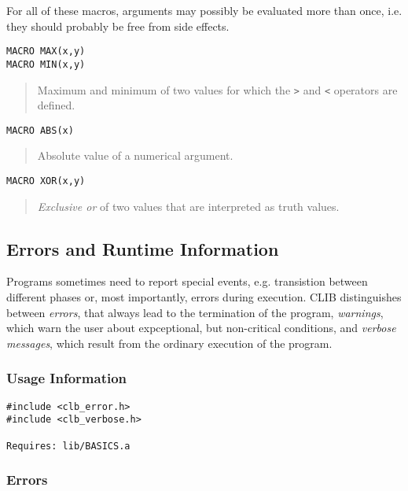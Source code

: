 For all of these macros, arguments may possibly be evaluated more than
once, i.e. they should probably be free from side effects.

\begin{verbatim}
MACRO MAX(x,y)
MACRO MIN(x,y)
\end{verbatim}
\begin{quote}
  Maximum and minimum of two values for which the \texttt{>} and
  \texttt{<} operators are defined.
\end{quote}

\begin{verbatim}
MACRO ABS(x)
\end{verbatim}
\begin{quote}
  Absolute value of a numerical argument.
\end{quote}

\begin{verbatim}
MACRO XOR(x,y)
\end{verbatim}
\begin{quote}
  \emph{Exclusive or} of two values that are interpreted as truth
  values.
\end{quote}


\subsection{Errors and Runtime Information}
\label{sec:basics:errors}

Programs sometimes need to report special events, e.g. transistion
between different phases or, most importantly, errors during
execution. CLIB distinguishes between \emph{errors}, that always lead
to the termination of the program, \emph{warnings}, which warn the
user about expceptional, but non-critical conditions, and
\emph{verbose messages}, which result from the ordinary execution of
the program.

\subsubsection{Usage Information}

\begin{verbatim}
#include <clb_error.h>
#include <clb_verbose.h>

Requires: lib/BASICS.a
\end{verbatim}


\subsubsection{Errors}

